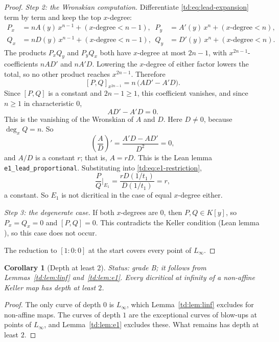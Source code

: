 \documentclass[a4paper,11pt]{article}
\newcommand{\filename}[1]{\texttt{\seqsplit{#1}}}
\theoremstyle{jsplain}
\newtheorem{corollary}[theorem]{Corollary}
\theoremstyle{jsdef}
\theoremstyle{jsrem}
\begin{document}
\begin{proof}
\emph{Step 2: the Wronskian computation.} Differentiate \eqref{td:eq:lead-expansion} term by
term and keep the top $x$-degree:
\begin{align*}
P_x &= n A(y)\, x^{n-1} + (\text{$x$-degree} < n-1), &
P_y &= A'(y)\, x^{n} + (\text{$x$-degree} < n), \\
Q_x &= n D(y)\, x^{n-1} + (\text{$x$-degree} < n-1), &
Q_y &= D'(y)\, x^{n} + (\text{$x$-degree} < n).
\end{align*}
The products $P_x Q_y$ and $P_y Q_x$ both have $x$-degree at most $2n - 1$, with
$x^{2n-1}$-coefficients $nAD'$ and $nA'D$. Lowering the $x$-degree of either factor lowers the
total, so no other product reaches $x^{2n-1}$. Therefore
\begin{equation}\label{td:eq:wronskian-coeff}
[P,Q]_{x^{2n-1}} = n\,\big(A D' - A' D\big).
\end{equation}
Since $[P,Q]$ is a constant and $2n - 1 \geq 1$, this coefficient vanishes, and since $n \geq 1$
in characteristic $0$,
\[
A D' - A' D = 0.
\]
This is the vanishing of the Wronskian of $A$ and $D$. Here $D \neq 0$, because $\deg_x Q = n$.
So
\[
\left(\frac{A}{D}\right)' = \frac{A' D - A D'}{D^2} = 0,
\]
and $A/D$ is a constant $r$; that is, $A = rD$. This is the Lean lemma
\texttt{e1\_\allowbreak{}lead\_\allowbreak{}proportional}. Substituting into \eqref{td:eq:e1-restriction},
\[
\frac{P}{Q}\bigg|_{E_1} = \frac{r D(1/t_1)}{D(1/t_1)} = r,
\]
a constant. So $E_1$ is not dicritical in the case of equal $x$-degree either.

\emph{Step 3: the degenerate case.} If both $x$-degrees are $0$, then $P, Q \in K[y]$, so
$P_x = Q_x = 0$ and $[P,Q] = 0$. This contradicts the Keller condition (Lean lemma
\filename{jac2\_eq\_zero\_of\_natDegree\_zero}), so this case does not occur.

The reduction to $[1:0:0]$ at the start covers every point of $L_\infty$.
\end{proof}

\begin{corollary}[Depth at least $2$]\label{td:cor:depth2}
\textit{Status: grade B; it follows from Lemmas~\ref{td:lem:linf} and~\ref{td:lem:e1}.}
Every dicritical at infinity of a non-affine Keller map has depth at least $2$.
\end{corollary}

\begin{proof}
The only curve of depth $0$ is $L_\infty$, which Lemma~\ref{td:lem:linf} excludes for non-affine
maps. The curves of depth $1$ are the exceptional curves of blow-ups at points of $L_\infty$, and
Lemma~\ref{td:lem:e1} excludes these. What remains has depth at least $2$.
\end{proof}
\end{document}
